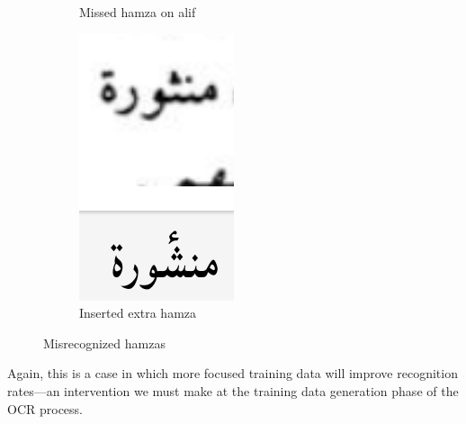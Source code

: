 \begin{figure}[h]
\begin{subfigure}[b]{0.3\linewidth}
	\caption{Missed hamza on alif}
	\label{fig:fig19}
	\end{subfigure}
	\begin{subfigure}[b]{0.3\linewidth}
	\centering
	\includegraphics[width=\textwidth]{images/image30.png}
	\caption{Inserted extra hamza}
	\label{fig:fig20}
	\end{subfigure}
	\caption{Misrecognized hamzas}
	\label{fig:fig1820}
\end{figure}

Again, this is a case in which more focused training data will improve
recognition rates—an intervention we must make at the training data generation
phase of the OCR process.  

